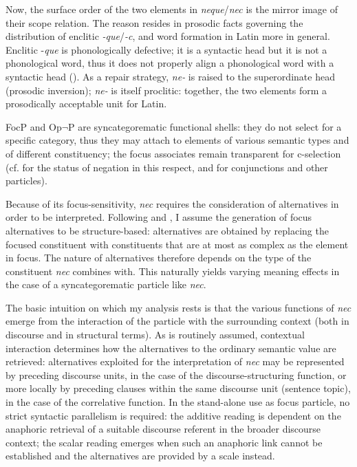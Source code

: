 \documentclass[output=paper]{langsci/langscibook}
\begin{document}
Now, the surface order of the two elements in \emph{neque}\slash\emph{nec} is the mirror image of their scope relation. The reason resides in prosodic facts governing the distribution of enclitic {\emph{-que}}/{\emph{-c}}, and word formation in Latin more in general. Enclitic -{\emph{que}} is phonologically defective; it is a syntactic head but it is not a phonological word, thus it does not properly align a phonological word with a syntactic head (\citealt[]{AgbayaniGolston10}). As a repair strategy, {\emph{ne-}} is raised to the superordinate head (prosodic inversion); {\emph{ne-}} is itself proclitic: together, the two elements form a prosodically acceptable unit for Latin.

FocP and Op$\lnot$P are syncategorematic functional shells: they do not select for a specific category, thus they may attach to elements of various semantic types and of different constituency; the focus associates remain transparent for c-selection (cf. \citealt[120--126]{Cinque1999} for the status of negation in this respect, and \citealt[199--203]{BHR14} for conjunctions and other particles).

Because of its focus-sensitivity, {\emph{nec}} requires the consideration of alternatives in order to be interpreted. Following \citet{Katzir07} and \citet{FoxKatzir11}, I assume the generation of focus alternatives to be structure-based: alternatives are obtained by replacing the focused constituent with constituents that are at most as complex as the element in focus. The nature of alternatives therefore depends on the type of the constituent {\emph{nec}} combines with. This naturally yields varying meaning effects in the case of a syncategorematic particle like {\emph{nec}}.

The basic intuition on which my analysis rests is that the various functions of {\emph{nec}} emerge from the interaction of the particle with the surrounding context (both in discourse and in structural terms). As is routinely assumed, contextual interaction determines how the alternatives to the ordinary semantic value are retrieved: alternatives exploited for the interpretation of {\emph{nec}} may be represented by preceding discourse units, in the case of the discourse-structuring function, or more locally by preceding clauses within the same discourse unit (sentence topic), in the case of the correlative function. In the stand-alone use as focus particle, no strict syntactic parallelism is required: the additive reading is dependent on the anaphoric retrieval of a suitable discourse referent in the broader discourse context; the scalar reading emerges when such an anaphoric link cannot be established and the alternatives are provided by a scale instead.
\end{document}
